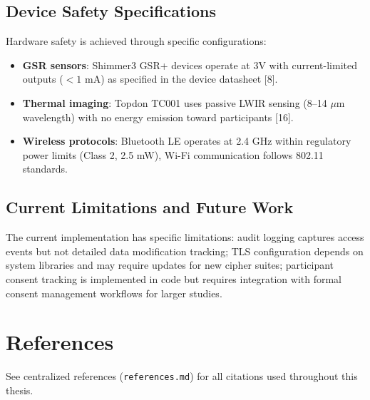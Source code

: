 \subsection{Device Safety Specifications}
Hardware safety is achieved through specific configurations:
\begin{itemize}
  \item \textbf{GSR sensors}: Shimmer3 GSR+ devices operate at 3V with current-limited outputs ($<1$ mA) as specified in the device datasheet [8].
  \item \textbf{Thermal imaging}: Topdon TC001 uses passive LWIR sensing (8--14 $\mu$m wavelength) with no energy emission toward participants [16].
  \item \textbf{Wireless protocols}: Bluetooth LE operates at 2.4 GHz within regulatory power limits (Class 2, 2.5 mW), Wi-Fi communication follows 802.11 standards.
\end{itemize}

\subsection{Current Limitations and Future Work}
The current implementation has specific limitations: audit logging captures access events but not detailed data modification tracking; TLS configuration depends on system libraries and may require updates for new cipher suites; participant consent tracking is implemented in code but requires integration with formal consent management workflows for larger studies.

\section*{References}
See centralized references (\texttt{references.md}) for all citations used throughout this thesis. %
